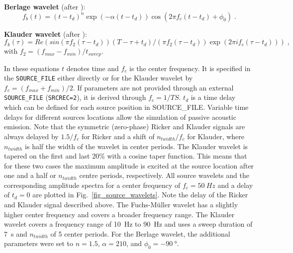 \textbf{Berlage wavelet} (after \cite{aldrige:90}):
\begin{equation}
    f_b(t)=(t-t_d)^n \exp(- \alpha (t-t_d)) \cos(2 \pi f_c (t-t_d) + \phi_0)\;.
    \label{eq_berlage}
\end{equation}

\textbf{Klauder wavelet} (after \cite{neelima:18}):
\begin{equation}
    f_k(\tau) = \textit{Re}(sin(\pi f_2 (\tau-t_d)) (T-\tau+t_d)/(\pi f_2 (\tau-t_d))\exp(2 \pi i f_c (\tau-t_d)))\;,
    \label{eq_klauder}
\end{equation}
with $f_2=(f_{max}-f_{min})/t_{sweep}$.

In these equations $t$ denotes time and $f_c$ is the center frequency. It is specified in the \texttt{SOURCE\_FILE} either directly or for the Klauder wavelet by $f_c=(f_{max}+f_{min})/2$. If parameters are not provided through an external \texttt{SOURCE\_FILE} (\texttt{SRCREC=2}), it is derived through $f_c=1/TS$. $t_d$ is a time delay which can be defined for each source position in SOURCE\_FILE. Variable time delays for different sources locations allow the simulation of passive acoustic emission. Note that the symmetric (zero-phase) Ricker and Klauder signals are always delayed by $1.5/f_c$ for Ricker and a shift of $n_{twidth}/f_c$ for Klauder, where $n_{twidth}$ is half the width of the wavelet in center periods. The Klauder wavelet is tapered on the first and last 20\% with a cosine taper function. This means that for these two cases the maximum amplitude is excited at the source location after one and a half or $n_{twidth}$ centre periods, respectively. All source wavelets and the corresponding amplitude spectra for a center frequency of $f_c=\SI{50}{Hz}$ and a delay of $t_d=0$ are plotted in Fig.~\ref{fig_source_wavelets}. Note the delay of the Ricker and Klauder signal described above. The  Fuchs-M\"uller wavelet has a slightly higher center frequency and covers a broader frequency range. The Klauder wavelet covers a frequency range of \SI{10}{Hz} to \SI{90}{Hz} and uses a sweep duration of \SI{7}{s} and $n_{twidth}$ of 5 center periods. For the Berlage wavelet, the additional parameters were set to $n=1.5$, $\alpha=210$, and $\phi_0=\SI{-90}{\degree}$.

